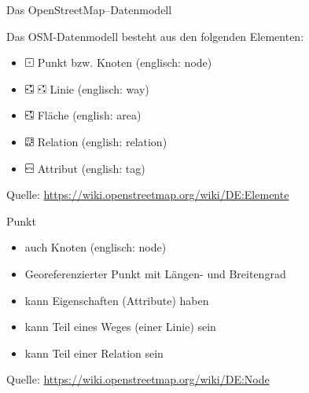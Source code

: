\documentclass{beamer}
\begin{document}
\begin{frame}[fragile]{Das OpenStreetMap--Datenmodell}

Das OSM-Datenmodell besteht aus den folgenden Elementen:
\begin{itemize}
  \item \includegraphics[height=0.8em]{node}\hspace{0.2em} Punkt bzw. Knoten (englisch: node) 
  \item \includegraphics[height=0.8em]{way} \hspace{0.2em} \includegraphics[height=0.8em]{closed_way}\hspace{0.2em} Linie (englisch: way)
  \item \includegraphics[height=0.8em]{area} \hspace{0.2em} Fläche (english: area) 
  \item \includegraphics[height=0.8em]{relation} \hspace{0.2em} Relation (english: relation) 
  \item \includegraphics[height=0.8em]{tag} \hspace{0.2em}Attribut (english: tag) 

\end{itemize}

Quelle: \url{https://wiki.openstreetmap.org/wiki/DE:Elemente}

\end{frame}

\begin{frame}[fragile]{Punkt}

\begin{itemize}
  \item auch Knoten (englisch: node)
  \item Georeferenzierter Punkt mit Längen- und Breitengrad
  \item kann Eigenschaften (Attribute) haben
  \item kann Teil eines Weges (einer Linie) sein
  \item kann Teil einer Relation sein
\end{itemize}

Quelle: \url{https://wiki.openstreetmap.org/wiki/DE:Node}

\end{frame}
\end{document}

